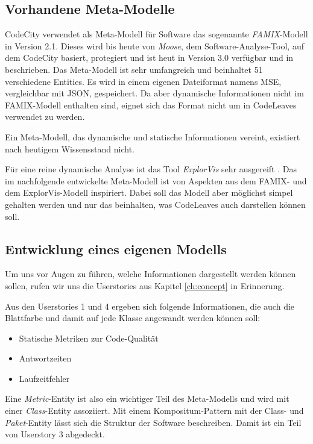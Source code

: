\subsection*{Vorhandene Meta-Modelle}

CodeCity verwendet als Meta-Modell für Software das sogenannte \textit{FAMIX}-Modell in Version 2.1. Dieses wird bis heute von \textit{Moose}, dem Software-Analyse-Tool, auf dem CodeCity basiert, protegiert und ist heut in Version 3.0 verfügbar und in \cite{merrill1916moose} beschrieben. Das Meta-Modell ist sehr umfangreich und beinhaltet 51 verschiedene Entities. Es wird in einem eigenen Dateiformat namens MSE, vergleichbar mit JSON, gespeichert. Da aber dynamische Informationen nicht im FAMIX-Modell enthalten sind, eignet sich das Format nicht um in CodeLeaves verwendet zu werden.

Ein Meta-Modell, das dynamische und statische Informationen vereint, existiert nach heutigem Wissensstand nicht.

Für eine reine dynamische Analyse ist das Tool \textit{ExplorVis} sehr ausgereift \cite{fittkau2017software}. Das im nachfolgende entwickelte Meta-Modell ist von Aspekten aus dem FAMIX- und dem ExplorVis-Modell inspiriert. Dabei soll das Modell aber möglichst simpel gehalten werden und nur das beinhalten, was CodeLeaves auch darstellen können soll.

\subsection*{Entwicklung eines eigenen Modells}

Um uns vor Augen zu führen, welche Informationen dargestellt werden können sollen, rufen wir uns die Userstories aus Kapitel \ref{ch:concept} in Erinnerung.

Aus den Userstories 1 und 4 ergeben sich folgende Informationen, die auch die Blattfarbe und damit auf jede Klasse angewandt werden können soll:

\begin{itemize}
  \item Statische Metriken zur Code-Qualität
  \item Antwortzeiten
  \item Laufzeitfehler
\end{itemize}

Eine \textit{Metric}-Entity ist also ein wichtiger Teil des Meta-Modells und wird mit einer \textit{Class}-Entity assoziiert. Mit einem Kompositum-Pattern mit der Class- und \textit{Paket}-Entity lässt sich die Struktur der Software beschreiben. Damit ist ein Teil von Userstory 3 abgedeckt.


